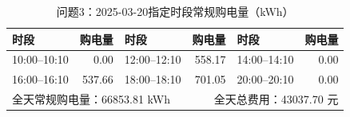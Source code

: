 \begin{table}[H]\centering\small
\caption{问题3：2025-03-20指定时段常规购电量（kWh）}
\label{tab:q3_0320_purchase}
\begin{tabular}{lrlrlr}\toprule
时段 & 购电量 & 时段 & 购电量 & 时段 & 购电量 \\\midrule
10:00--10:10 & 0.00 & 12:00--12:10 & 558.17 & 14:00--14:10 & 0.00 \\
16:00--16:10 & 537.66 & 18:00--18:10 & 701.05 & 20:00--20:10 & 0.00 \\
\midrule
\multicolumn{3}{l}{全天常规购电量：66853.81 kWh} & \multicolumn{3}{r}{全天总费用：43037.70 元}\\
\bottomrule\end{tabular}\end{table}

